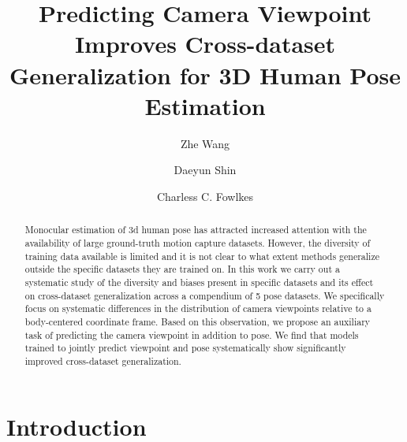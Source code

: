 \documentclass[runningheads]{llncs}
\newlength\secmargin
\newlength\paramargin
\newlength\figmargin
\begin{document}
\pagestyle{headings}
\mainmatter
\def\ECCVSubNumber{2233}  

\title{Predicting Camera Viewpoint Improves Cross-dataset Generalization for 
3D Human Pose Estimation}



\begin{comment}
\titlerunning{ECCV-20 submission ID \ECCVSubNumber} 
\authorrunning{ECCV-20 submission ID \ECCVSubNumber} 
\author{Anonymous ECCV submission}
\institute{Paper ID \ECCVSubNumber}
\end{comment}


\def\etal{\emph{et al.}\xspace}

\author{Zhe Wang \and Daeyun Shin \and Charless C. Fowlkes}


\maketitle
\setlength{\figmargin}{-7.0mm}
\setlength{\paramargin}{-2.0mm}
\setlength{\secmargin}{-1.0mm}

\begin{abstract}
Monocular estimation of 3d human pose has attracted increased attention with
the availability of large ground-truth motion capture datasets.  However, the
diversity of training data available is limited and it is not clear to what
extent methods generalize outside the specific datasets they are trained on.
In this work we carry out a systematic study of the diversity and biases
present in specific datasets and its effect on cross-dataset generalization
across a compendium of 5 pose datasets. We specifically focus on systematic
differences in the distribution of camera viewpoints relative to a body-centered
coordinate frame.  Based on this observation, we propose an auxiliary task of
predicting the camera viewpoint in addition to pose. We find that models
trained to jointly predict viewpoint and pose systematically show significantly
improved cross-dataset generalization.
\end{abstract}


\section{Introduction}
\label{sec:introduction}
\end{document}
